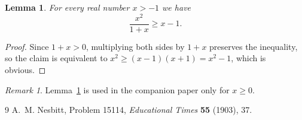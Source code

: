 \documentclass[11pt]{article}
\newtheorem{lemma}[theorem]{Lemma}
\theoremstyle{remark}
\newtheorem{remark}[theorem]{Remark}
\begin{document}
\begin{lemma}\label{lem:quot}
For every real number $x > -1$ we have
\[
  \frac{x^2}{1+x} \ge x - 1 .
\]
\end{lemma}

\begin{proof}
Since $1+x > 0$, multiplying both sides by $1+x$ preserves the inequality, so the claim
is equivalent to $x^2 \ge (x-1)(x+1) = x^2 - 1$, which is obvious.
\end{proof}

\begin{remark}
Lemma~\ref{lem:quot} is used in the companion paper only for $x \ge 0$.
\end{remark}

\begin{thebibliography}{9}
A.~M. Nesbitt, Problem 15114, \emph{Educational Times} \textbf{55} (1903), 37.
\end{thebibliography}
\end{document}
